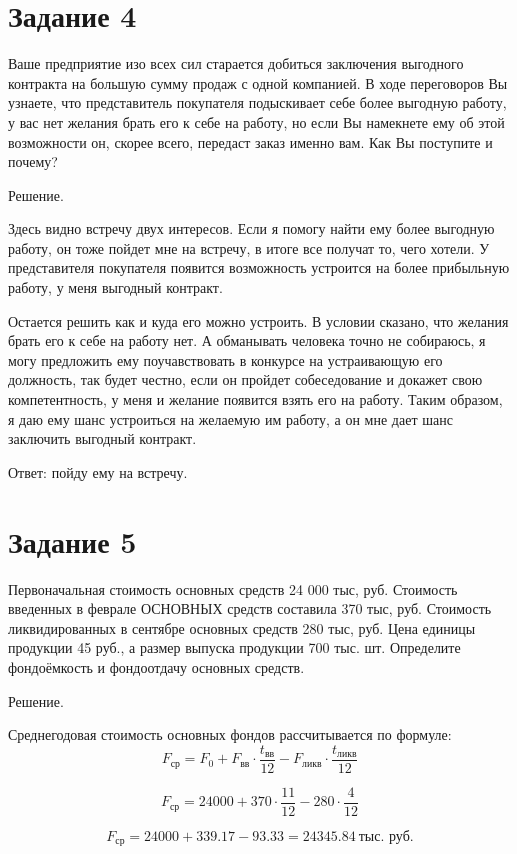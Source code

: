 \documentclass[14pt,a4paper]{extarticle}
\begin{document}
\section{Задание 4}

Ваше предприятие изо всех сил старается добиться заключения выгодного контракта
на большую сумму продаж с одной компанией. В ходе переговоров Вы узнаете, что
представитель покупателя подыскивает себе более выгодную работу, у вас нет желания
брать его к себе на работу, но если Вы намекнете ему об этой возможности он, скорее
всего, передаст заказ именно вам. Как Вы поступите и почему?

Решение.

Здесь видно встречу двух интересов. Если я помогу найти ему более выгодную
работу, он тоже пойдет мне на встречу, в итоге все получат то, чего хотели. У
представителя покупателя появится возможность устроится на более прибыльную
работу, у меня выгодный контракт.

Остается решить как и куда его можно устроить. В условии сказано, что желания
брать его к себе на работу нет. А обманывать человека точно не собираюсь,
я могу предложить ему поучавствовать в конкурсе на устраивающую его должность,
так будет честно, если он пройдет собеседование и докажет свою компетентность,
у меня и желание появится взять его на работу. Таким образом, я даю ему шанс
устроиться на желаемую им работу, а он мне дает шанс заключить выгодный
контракт.

Ответ: пойду ему на встречу.

\section{Задание 5}

Первоначальная стоимость основных средств 24 000 тыс, руб. Стоимость введенных
в феврале ОСНОВНЫХ средств составила 370 тыс, руб. Стоимость ликвидированных в
сентябре основных средств 280 тыс, руб. Цена единицы продукции 45 руб., а размер
выпуска продукции 700 тыс. шт.
Определите фондоёмкость и фондоотдачу основных средств.

Решение.

Среднегодовая стоимость основных фондов рассчитывается по формуле:
\[
F_{\text{ср}} = F_0 + F_{\text{вв}} \cdot \frac{t_{\text{вв}}}{12}
               - F_{\text{ликв}} \cdot \frac{t_{\text{ликв}}}{12}
\]

\[
F_{\text{ср}} = 24000 + 370 \cdot \frac{11}{12} - 280 \cdot \frac{4}{12}
\]

\[
F_{\text{ср}} = 24000 + 339.17 - 93.33 = 24345.84\ \text{тыс.~руб.}
\]
\end{document}
